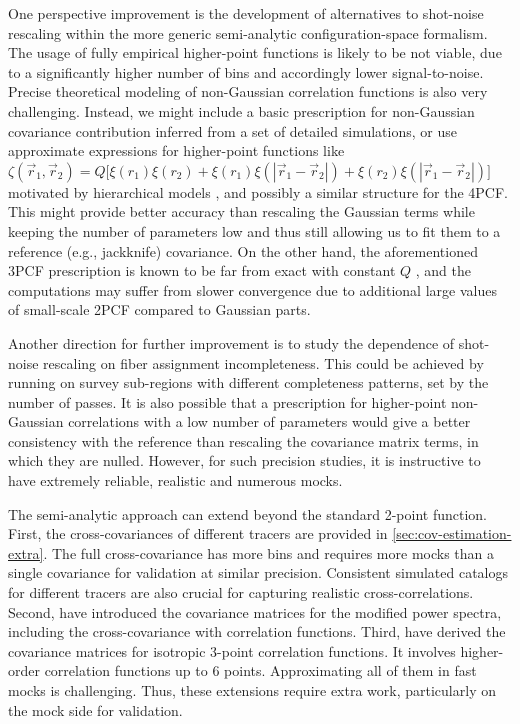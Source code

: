 One perspective improvement is the development of alternatives to shot-noise rescaling within the more generic semi-analytic configuration-space formalism.
The usage of fully empirical higher-point functions is likely to be not viable, due to a significantly higher number of bins and accordingly lower signal-to-noise.
Precise theoretical modeling of non-Gaussian correlation functions is also very challenging.
Instead, we might include a basic prescription for non-Gaussian covariance contribution inferred from a set of detailed simulations, or use approximate expressions for higher-point functions like $\zeta(\vec r_1,\vec r_2) = Q\big[\xi(r_1)\xi(r_2)+\xi(r_1)\xi(|\vec r_1-\vec r_2|) + \xi(r_2)\xi(|\vec r_1-\vec r_2|)\big]$ motivated by hierarchical models \citep{hierarchical-3PCF}, and possibly a similar structure for the 4PCF.
This might provide better accuracy than rescaling the Gaussian terms while keeping the number of parameters low and thus still allowing us to fit them to a reference (e.g., jackknife) covariance.
On the other hand, the aforementioned 3PCF prescription is known to be far from exact with constant $Q$ \citep{Q-3PCF}, and the computations may suffer from slower convergence due to additional large values of small-scale 2PCF compared to Gaussian parts.

Another direction for further improvement is to study the dependence of shot-noise rescaling on fiber assignment incompleteness.
This could be achieved by running \rascalc{} on survey sub-regions with different completeness patterns, set by the number of passes.
It is also possible that a prescription for higher-point non-Gaussian correlations with a low number of parameters would give a better consistency with the reference than rescaling the covariance matrix terms, in which they are nulled.
However, for such precision studies, it is instructive to have extremely reliable, realistic and numerous mocks.

The semi-analytic approach can extend beyond the standard 2-point function.
First, the cross-covariances of different tracers are provided in \cref{sec:cov-estimation-extra}.
The full cross-covariance has more bins and requires more mocks than a single covariance for validation at similar precision.
Consistent simulated catalogs for different tracers are also crucial for capturing realistic cross-correlations.
Second, \cite{rascalc-power-spectrum} have introduced the covariance matrices for the modified power spectra, including the cross-covariance with correlation functions.
Third, \cite{rascalC-legendre-3} have derived the covariance matrices for isotropic 3-point correlation functions.
It involves higher-order correlation functions up to 6 points.
Approximating all of them in fast mocks is challenging.
Thus, these extensions require extra work, particularly on the mock side for validation.

